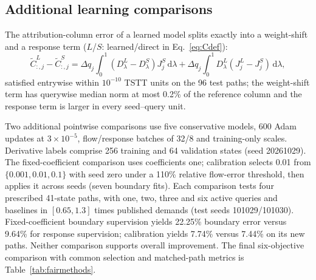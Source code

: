 \subsection{Additional learning comparisons}\label{app:legacy-learning}\label{app:learning-protocol}\label{app:calibration-protocol}
The attribution-column error of a learned model splits exactly into a
weight-shift and a response term ($L$/$S$: learned/direct in
Eq.~\eqref{eq:Cdef}):
\begin{equation}
\widetilde C_{:,j}^{L}-\widetilde C_{:,j}^{S}
=\Delta q_j\int_0^1(D_\lambda^{L}-D_\lambda^{S})J_j^{S}\,\mathrm{d}\lambda
+\Delta q_j\int_0^1D_\lambda^{L}(J_j^{L}-J_j^{S})\,\mathrm{d}\lambda,
\label{eq:coldecomp}
\end{equation}
satisfied entrywise within $10^{-10}$ TSTT units on the 96 test paths;
the weight-shift term has querywise median norm at most 0.2\% of the
reference column and the response term is larger in every seed--query
unit.

Two additional pointwise comparisons use five conservative models, 600 Adam updates at $3\times10^{-5}$, flow/response batches of 32/8 and training-only scales. Derivative labels comprise 256 training and 64 validation states (seed 20261029). The fixed-coefficient comparison uses coefficients one; calibration selects 0.01 from $\{0.001,0.01,0.1\}$ with seed zero under a 110\% relative flow-error threshold, then applies it across seeds (seven boundary fits). Each comparison tests four prescribed 41-state paths, with one, two, three and six active queries and baselines in $[0.65,1.3]$ times published demands (test seeds 101029/101030). Fixed-coefficient boundary supervision yields 22.25\% boundary error versus 9.64\% for response supervision; calibration yields 7.74\% versus 7.44\% on its new paths. Neither
comparison supports overall improvement. The final six-objective
comparison with common selection and matched-path metrics is
Table~\ref{tab:fairmethods}.

